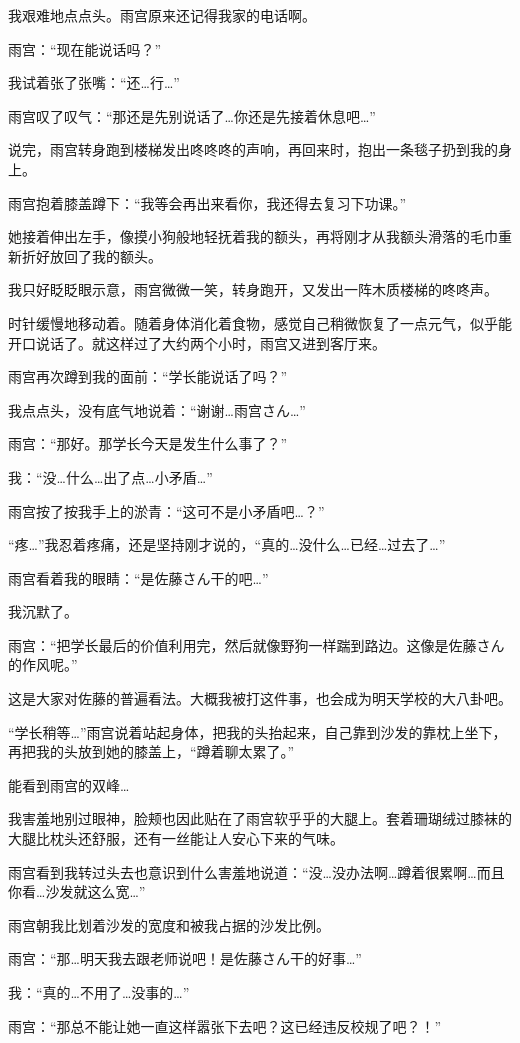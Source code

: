 我艰难地点点头。雨宫原来还记得我家的电话啊。

雨宫：“现在能说话吗？”

我试着张了张嘴：“还…行…”

雨宫叹了叹气：“那还是先别说话了…你还是先接着休息吧…”

说完，雨宫转身跑到楼梯发出咚咚咚的声响，再回来时，抱出一条毯子扔到我的身上。

雨宫抱着膝盖蹲下：“我等会再出来看你，我还得去复习下功课。”

她接着伸出左手，像摸小狗般地轻抚着我的额头，再将刚才从我额头滑落的毛巾重新折好放回了我的额头。

我只好眨眨眼示意，雨宫微微一笑，转身跑开，又发出一阵木质楼梯的咚咚声。

时针缓慢地移动着。随着身体消化着食物，感觉自己稍微恢复了一点元气，似乎能开口说话了。就这样过了大约两个小时，雨宫又进到客厅来。

雨宫再次蹲到我的面前：“学长能说话了吗？”

我点点头，没有底气地说着：“谢谢…雨宫さん…”

雨宫：“那好。那学长今天是发生什么事了？”

我：“没…什么…出了点…小矛盾…”

雨宫按了按我手上的淤青：“这可不是小矛盾吧…？”

“疼…”我忍着疼痛，还是坚持刚才说的，“真的…没什么…已经…过去了…”

雨宫看着我的眼睛：“是佐藤さん干的吧…”

我沉默了。

雨宫：“把学长最后的价值利用完，然后就像野狗一样踹到路边。这像是佐藤さん的作风呢。”

这是大家对佐藤的普遍看法。大概我被打这件事，也会成为明天学校的大八卦吧。

“学长稍等…”雨宫说着站起身体，把我的头抬起来，自己靠到沙发的靠枕上坐下，再把我的头放到她的膝盖上，“蹲着聊太累了。”

能看到雨宫的双峰…

我害羞地别过眼神，脸颊也因此贴在了雨宫软乎乎的大腿上。套着珊瑚绒过膝袜的大腿比枕头还舒服，还有一丝能让人安心下来的气味。

雨宫看到我转过头去也意识到什么害羞地说道：“没…没办法啊…蹲着很累啊…而且你看…沙发就这么宽…”

雨宫朝我比划着沙发的宽度和被我占据的沙发比例。

雨宫：“那…明天我去跟老师说吧！是佐藤さん干的好事…”

我：“真的…不用了…没事的…”

雨宫：“那总不能让她一直这样嚣张下去吧？这已经违反校规了吧？！”

